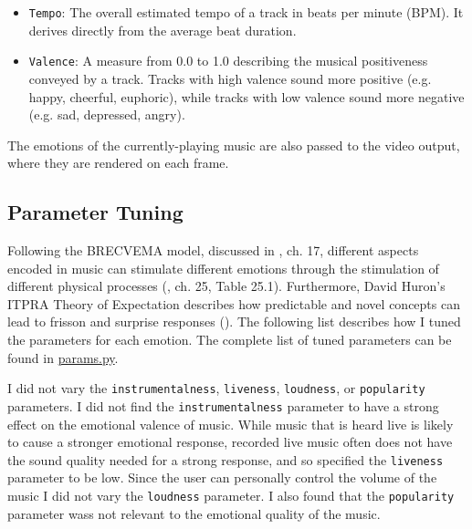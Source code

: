 \documentclass{article}
\renewcommand{\_}[1]{\underline{ #1 }}
\theoremstyle{definition}
\begin{document}
\begin{itemize}
    \item \texttt{Tempo}: The overall estimated tempo of a track in beats per minute (BPM). It derives directly from the average beat duration.
    \item \texttt{Valence}: A measure from 0.0 to 1.0 describing the musical positiveness conveyed by a track. Tracks with high valence sound more positive (e.g. happy, cheerful, euphoric), while tracks with low valence sound more negative (e.g. sad, depressed, angry).
\end{itemize}

The emotions of the currently-playing music are also passed to the video output, where they are rendered on each frame.

\subsection[Parameter Tuning]{Parameter Tuning}
\label{Parameter Tuning}

Following the BRECVEMA model, discussed in \cite{juslin2019}, ch. 17, different aspects encoded in music can stimulate different emotions through the stimulation of different physical processes (\cite{juslin2019}, ch. 25, Table 25.1). Furthermore, David Huron's ITPRA Theory of Expectation describes how predictable and novel concepts can lead to frisson and surprise responses (\cite{huron2006}). The following list describes how I tuned the parameters for each emotion. The complete list of tuned parameters can be found in \href{https://github.com/as4mo3/face-the-music/blob/master/params.py}{params.py}. 

I did not vary the \texttt{instrumentalness}, \texttt{liveness}, \texttt{loudness}, or \texttt{popularity} parameters. I did not find the \texttt{instrumentalness} parameter to have a strong effect on the emotional valence of music. While music that is heard live is likely to cause a stronger emotional response, recorded live music often does not have the sound quality needed for a strong response, and so specified the \texttt{liveness} parameter to be low. Since the user can personally control the volume of the music I did not vary the \texttt{loudness} parameter. I also found that the \texttt{popularity} parameter wass not relevant to the emotional quality of the music. 
\end{document}
